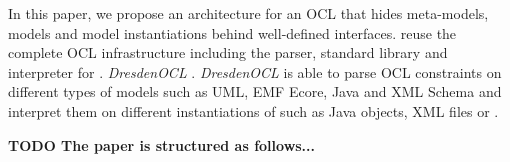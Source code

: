 In this paper, we propose an architecture for an OCL
 that hides meta-models,
models and model instantiations behind well-defined interfaces.  reuse
 the complete OCL infrastructure including the parser, standard library
and interpreter for .  \textit{DresdenOCL}
\cite{WWW:dresdenOCL}. \textit{DresdenOCL} is able to parse OCL
constraints on different types of models such as UML, EMF Ecore, Java and XML Schema 
and interpret them on different instantiations of 
such as Java objects, XML files or .

\textbf{TODO The paper is structured as follows...}